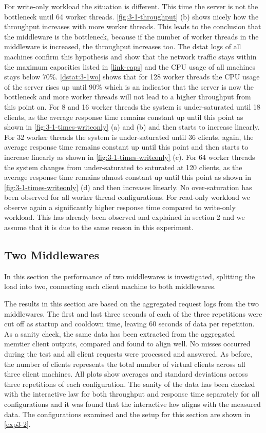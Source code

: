 \documentclass[11pt,a4paper]{article}
\begin{document}
For write-only workload the situation is different. This time the server is not the bottleneck until 64 worker threads. \autoref{fig:3-1-throughput} (b) shows nicely how the throughput increases with more worker threads. This leads to the conclusion that the middleware is the bottleneck, because if the number of worker threads in the middleware is increased, the throughput increases too. The dstat logs of all machines confirm this hypothesis and show that the network traffic stays within the maximum capacities listed in \autoref{link-caps} and the CPU usage of all machines stays below 70\%.
\autoref{dstat:3-1wo} shows that for 128 worker threads the CPU usage of the server rises up until 90\% which is an indicator that the server is now the bottleneck and more worker threads will not lead to a higher throughput from this point on.
For 8 and 16 worker threads the system is under-saturated until 18 clients, as the average response time remains constant up until this point as shown in \autoref{fig:3-1-times-writeonly} (a) and (b) and then starts to increase linearly.
For 32 worker threads the system is under-saturated until 36 clients, again, the average response time remains constant up until this point and then starts to increase linearly as shown in \autoref{fig:3-1-times-writeonly} (c).
For 64 worker threads the system changes from under-saturated to saturated at 120 clients, as the average response time remains almost constant up until this point as shown in \autoref{fig:3-1-times-writeonly} (d) and then increases linearly.
No over-saturation has been observed for all worker thread configurations.
For read-only workload we observe again a significantly higher response time compared to write-only workload. This has already been observed and explained in section 2 and we assume that it is due to the same reason in this experiment.


\subsection{Two Middlewares} \label{sec3.2}

In this section the performance of two middlewares is investigated, splitting the load into two, connecting each client machine to both middlewares.

The results in this section are based on the aggregated request logs from the two middlewares. The first and last three seconds of each of the three repetitions were cut off as startup and cooldown time, leaving 60 seconds of data per repetition. As a sanity check, the same data has been extracted from the aggregated memtier client outputs, compared and found to align well. No misses occurred during the test and all client requests were processed and answered. As before, the number of clients represents the total number of virtual clients across all three client machines. All plots show averages and standard deviations across three repetitions of each configuration. The sanity of the data has been checked with the interactive law for both throughput and response time separately for all configurations and it was found that the interactive law aligns with the measured data. The configurations examined and the setup for this section are shown in \autoref{exp3-2}.
\end{document}
